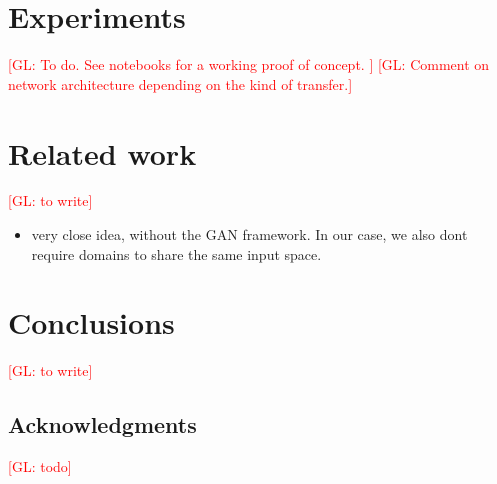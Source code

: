 \documentclass{article}
\newcommand{\glnote}[1]{\textcolor{red}{[GL: #1]}}
\theoremstyle{plain}
\begin{document}
\section{Experiments}

\glnote{To do. See notebooks for a working proof of concept. }
\glnote{Comment on network architecture depending on the kind of transfer.}


\section{Related work}

\glnote{to write}

\begin{itemize}
    \item \cite{ganin2014unsupervised} very close idea, without the GAN framework. In our case, we also dont require domains to share the same input space.
\end{itemize}


\section{Conclusions}

\glnote{to write}

\subsection*{Acknowledgments}

\glnote{todo}



\end{document}
